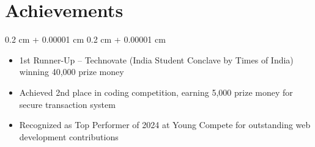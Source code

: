\documentclass[10pt, letterpaper]{article}
\newenvironment{highlights}{
    \begin{itemize}[
        topsep=0.10 cm,
        parsep=0.10 cm,
        partopsep=0pt,
        itemsep=0pt,
        leftmargin=0.4 cm + 10pt
    ]
}{
    \end{itemize}
} %
\newenvironment{onecolentry}{
    \begin{adjustwidth}{
        0.2 cm + 0.00001 cm
    }{
        0.2 cm + 0.00001 cm
    }
}{
    \end{adjustwidth}
} %
\begin{document}
    \section{Achievements}
    \begin{onecolentry}
        \begin{highlights}
            \item 1st Runner-Up – Technovate (India Student Conclave by Times of India) winning 40,000 prize money
            \item Achieved 2nd place in coding competition, earning 5,000 prize money for secure transaction system
            \item Recognized as Top Performer of 2024 at Young Compete for outstanding web development contributions
        \end{highlights}
    \end{onecolentry}
\end{document}
